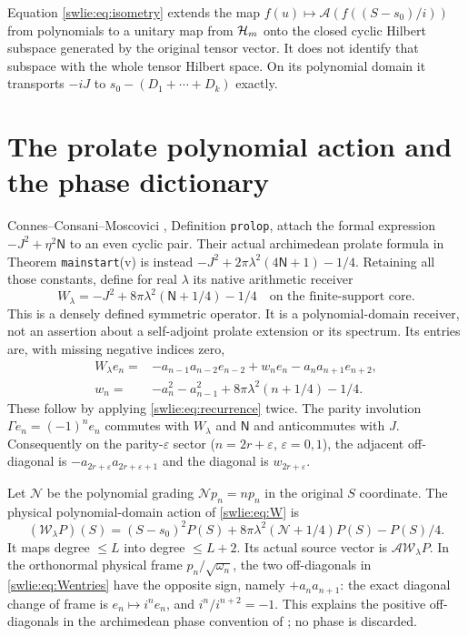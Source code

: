 \documentclass[11pt]{article}
\begin{document}
Equation \eqref{swlie:eq:isometry} extends the map
$f(u)\mapsto\mathcal A(f((S-s_0)/i))$ from polynomials to
a unitary map from $\mathcal H_m$ onto the closed cyclic Hilbert
subspace generated by the original tensor vector.
It does not identify that subspace with the whole tensor
Hilbert space. On its polynomial domain it transports
$-iJ$ to $s_0-(D_1+\cdots+D_k)$ exactly.

\section{The prolate polynomial action and the phase dictionary}

Connes--Consani--Moscovici \cite{swlie:CCM}, Definition
\texttt{prolop}, attach the formal expression $-J^2+\eta^2\mathsf N$
to an even cyclic pair. Their actual archimedean prolate
formula in Theorem \texttt{mainstart}(v) is instead
$-J^2+2\pi\lambda^2(4\mathsf N+1)-1/4$.
Retaining all those constants, define for real $\lambda$
its native arithmetic receiver
\begin{equation}\label{swlie:eq:W}
 W_\lambda=-J^2+8\pi\lambda^2(\mathsf N+1/4)-1/4
 \quad\text{on the finite-support core}.
\end{equation}
This is a densely defined symmetric operator.
It is a polynomial-domain receiver, not an assertion about
a self-adjoint prolate extension or its spectrum.
Its entries are, with missing negative indices zero,
\begin{equation}\label{swlie:eq:Wentries}
 \begin{split}
 W_\lambda e_n={}&-a_{n-1}a_{n-2}e_{n-2}
  +w_ne_n-a_na_{n+1}e_{n+2},\\
 w_n={}&-a_n^2-a_{n-1}^2+8\pi\lambda^2(n+1/4)-1/4.
 \end{split}
\end{equation}
These follow by applying \eqref{swlie:eq:recurrence} twice.
The parity involution $\Gamma e_n=(-1)^ne_n$ commutes with
$W_\lambda$ and $\mathsf N$ and anticommutes with $J$.
Consequently on the parity-$\varepsilon$ sector
($n=2r+\varepsilon$, $\varepsilon=0,1$), the adjacent off-diagonal
is $-a_{2r+\varepsilon}a_{2r+\varepsilon+1}$ and the
diagonal is $w_{2r+\varepsilon}$.

Let $\mathcal N$ be the polynomial grading
$\mathcal Np_n=np_n$ in the original $S$ coordinate.
The physical polynomial-domain action of \eqref{swlie:eq:W} is
\begin{equation}\label{swlie:eq:Wphysical}
 (\mathcal W_\lambda P)(S)
 =(S-s_0)^2P(S)+8\pi\lambda^2(\mathcal N+1/4)P(S)-P(S)/4.
\end{equation}
It maps degree $\leq L$ into degree $\leq L+2$.
Its actual source vector is $\mathcal A\mathcal W_\lambda P$.
In the orthonormal physical frame $p_n/\sqrt{\omega_n}$,
the two off-diagonals in \eqref{swlie:eq:Wentries} have the opposite
sign, namely $+a_na_{n+1}$: the exact diagonal change of
frame is $e_n\mapsto i^ne_n$, and $i^{n}/i^{n+2}=-1$.
This explains the positive off-diagonals in the archimedean
phase convention of \cite{swlie:CCM}; no phase is discarded.
\end{document}
